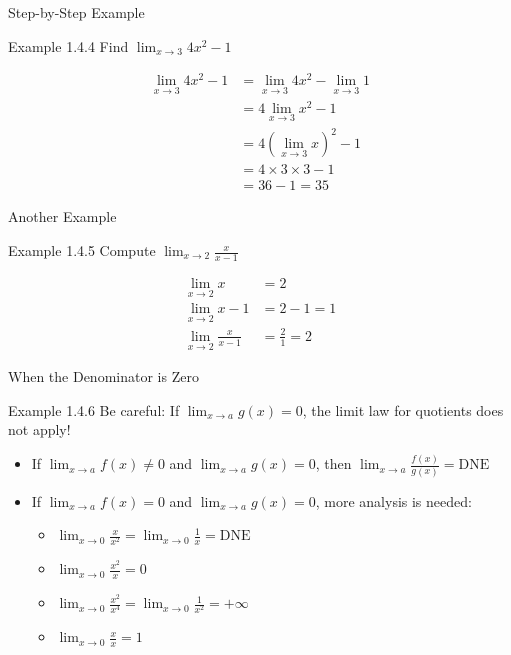 \documentclass[aspectratio=169]{beamer}
\newcommand{\limx}[2]{\lim_{x \to #1} #2}
\begin{document}
\begin{frame}{Step-by-Step Example}
\begin{block}{Example 1.4.4}
Find $\limx{3}{4x^2 - 1}$
\end{block}
\begin{align*}
  \limx{3}{4x^2 - 1} &= \limx{3}{4x^2} - \limx{3}{1} \\
  &= 4 \limx{3}{x^2} - 1 \\
  &= 4 (\limx{3}{x})^2 - 1 \\
  &= 4 \times 3 \times 3 - 1 \\
  &= 36 - 1 = 35
\end{align*}
\end{frame}

\begin{frame}{Another Example}
\begin{block}{Example 1.4.5}
Compute $\limx{2}{\frac{x}{x-1}}$
\end{block}
\begin{align*}
  \limx{2}{x} &= 2 \\
  \limx{2}{x-1} &= 2-1 = 1 \\
  \limx{2}{\frac{x}{x-1}} &= \frac{2}{1} = 2
\end{align*}
\end{frame}

\begin{frame}{When the Denominator is Zero}
\begin{block}{Example 1.4.6}
Be careful: If $\limx{a}{g(x)} = 0$, the limit law for quotients does not apply!
\end{block}
\begin{itemize}
  \item If $\limx{a}{f(x)} \neq 0$ and $\limx{a}{g(x)} = 0$, then $\limx{a}{\frac{f(x)}{g(x)}} = \text{DNE}$
  \item If $\limx{a}{f(x)} = 0$ and $\limx{a}{g(x)} = 0$, more analysis is needed:
    \begin{itemize}
      \item $\limx{0}{\frac{x}{x^2}} = \limx{0}{\frac{1}{x}} = \text{DNE}$
      \item $\limx{0}{\frac{x^2}{x}} = 0$
      \item $\limx{0}{\frac{x^2}{x^4}} = \limx{0}{\frac{1}{x^2}} = +\infty$
      \item $\limx{0}{\frac{x}{x}} = 1$
    \end{itemize}
\end{itemize}
\end{frame}
\end{document}
